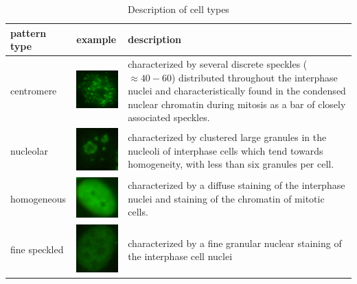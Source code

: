 \begin{table}
	\begin{center}
	\caption{Description of cell types}
	\label{tab:Desc}
	\begin{tabular}{|m{2.3cm}|m{2.1cm}|m{8cm}|}
		\hline
		\textbf{pattern type} & \textbf{example} & \textbf{description} \\
		\hline
		centromere & \includegraphics[width=2cm]{Figures/describing/centromere} & characterized by several 			discrete speckles ($ \approx 40-60$) distributed throughout the interphase nuclei and 		characteristically found in the condensed nuclear chromatin during mitosis as a bar of closely associated speckles. \\ \hline
		nucleolar & \vspace{5pt} \includegraphics[width=2cm]{Figures/describing/nucleolar} & characterized by clustered 			large granules in the nucleoli of interphase cells which tend towards homogeneity, with less than six granules per cell. \\ \hline
		homogeneous & \vspace{5pt} \includegraphics[width=2cm]{Figures/describing/homogeneous} & characterized by a 	diffuse staining of the interphase nuclei and staining of the chromatin of mitotic cells. \\ \hline
		
		fine speckled & \vspace{5pt} \includegraphics[width=2cm]{Figures/describing/fine_speckled} & characterized by a 			fine granular nuclear staining of the interphase cell nuclei \\ \hline
		

\end{tabular}
\end{center}
\end{table}
